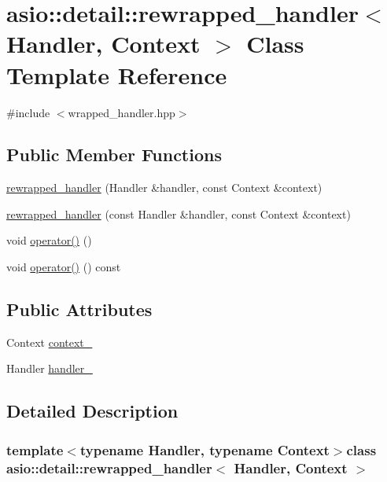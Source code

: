 \hypertarget{classasio_1_1detail_1_1rewrapped__handler}{}\section{asio\+:\+:detail\+:\+:rewrapped\+\_\+handler$<$ Handler, Context $>$ Class Template Reference}
\label{classasio_1_1detail_1_1rewrapped__handler}


{\ttfamily \#include $<$wrapped\+\_\+handler.\+hpp$>$}

\subsection*{Public Member Functions}
\begin{DoxyCompactItemize}
\item 
\hyperlink{classasio_1_1detail_1_1rewrapped__handler_a12eb32aee9e6ba57fee26f1c022c4f74}{rewrapped\+\_\+handler} (Handler \&handler, const Context \&context)
\item 
\hyperlink{classasio_1_1detail_1_1rewrapped__handler_a9dbb8a8163fb5f3a2ad63056f3630907}{rewrapped\+\_\+handler} (const Handler \&handler, const Context \&context)
\item 
void \hyperlink{classasio_1_1detail_1_1rewrapped__handler_a51f6819010dd83f38dab75abf5f04ddd}{operator()} ()
\item 
void \hyperlink{classasio_1_1detail_1_1rewrapped__handler_ace8db3285235b2e17f7c17cf60da18df}{operator()} () const 
\end{DoxyCompactItemize}
\subsection*{Public Attributes}
\begin{DoxyCompactItemize}
\item 
Context \hyperlink{classasio_1_1detail_1_1rewrapped__handler_aa4d5ba2fb7339e10ce2092b9cd38c705}{context\+\_\+}
\item 
Handler \hyperlink{classasio_1_1detail_1_1rewrapped__handler_aaa272366eec7b6ab446361ab4e4323e9}{handler\+\_\+}
\end{DoxyCompactItemize}


\subsection{Detailed Description}
\subsubsection*{template$<$typename Handler, typename Context$>$class asio\+::detail\+::rewrapped\+\_\+handler$<$ Handler, Context $>$}



